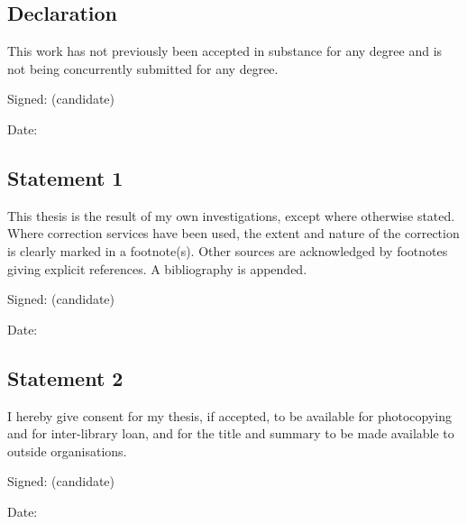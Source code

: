 



\newcommand{\signeddate}{
\vskip 30pt Signed: \dotfill (candidate)

\vskip 20pt Date: \dotfill\hphantom{ (candidate)}}

\vskip 10pt
\subsection*{Declaration}
This work has not previously been accepted in substance for any degree and is not being concurrently submitted for any degree.

\signeddate

\vskip 40pt
\subsection*{Statement 1}
This thesis is the result of my own investigations, except where otherwise stated. Where correction services have been used, the extent and nature of the correction is clearly marked in a footnote(s).
Other sources are acknowledged by footnotes giving explicit references. A bibliography is appended.

\signeddate

\vskip 40pt
\subsection*{Statement 2}
I hereby give consent for my thesis, if accepted, to be available for photocopying and for inter-library loan, and for the title and summary to be made available to outside organisations.

\signeddate




